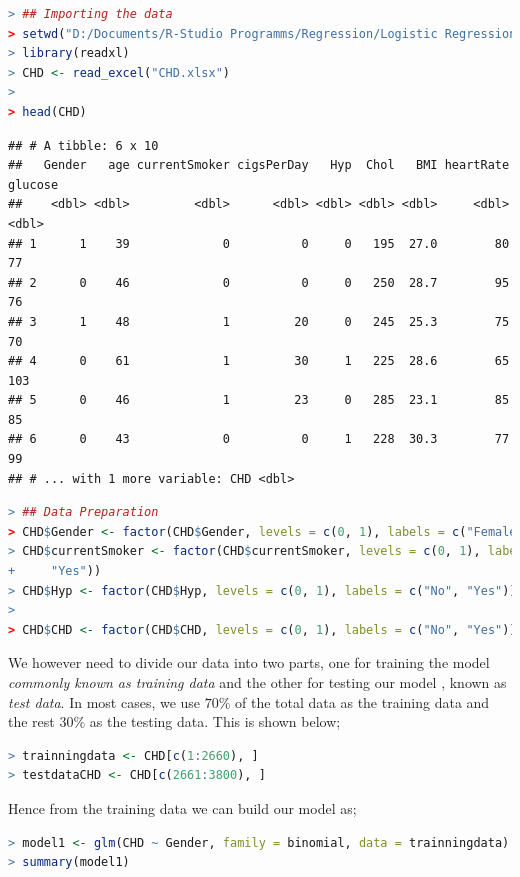 \documentclass[
]{article}
\begin{document}
\begin{lstlisting}[language=R]
> ## Importing the data
> setwd("D:/Documents/R-Studio Programms/Regression/Logistic Regression")
> library(readxl)
> CHD <- read_excel("CHD.xlsx")
> 
> head(CHD)
\end{lstlisting}

\begin{lstlisting}
## # A tibble: 6 x 10
##   Gender   age currentSmoker cigsPerDay   Hyp  Chol   BMI heartRate glucose
##    <dbl> <dbl>         <dbl>      <dbl> <dbl> <dbl> <dbl>     <dbl>   <dbl>
## 1      1    39             0          0     0   195  27.0        80      77
## 2      0    46             0          0     0   250  28.7        95      76
## 3      1    48             1         20     0   245  25.3        75      70
## 4      0    61             1         30     1   225  28.6        65     103
## 5      0    46             1         23     0   285  23.1        85      85
## 6      0    43             0          0     1   228  30.3        77      99
## # ... with 1 more variable: CHD <dbl>
\end{lstlisting}

\begin{lstlisting}[language=R]
> ## Data Preparation
> CHD$Gender <- factor(CHD$Gender, levels = c(0, 1), labels = c("Female", "Male"))
> CHD$currentSmoker <- factor(CHD$currentSmoker, levels = c(0, 1), labels = c("No",
+     "Yes"))
> CHD$Hyp <- factor(CHD$Hyp, levels = c(0, 1), labels = c("No", "Yes"))
> 
> CHD$CHD <- factor(CHD$CHD, levels = c(0, 1), labels = c("No", "Yes"))
\end{lstlisting}

We however need to divide our data into two parts, one for training the
model \emph{commonly known as training data} and the other for testing
our model , known as \emph{test data}. In most cases, we use \(70\%\) of
the total data as the training data and the rest \(30\%\) as the testing
data. This is shown below;

\begin{lstlisting}[language=R]
> trainningdata <- CHD[c(1:2660), ]
> testdataCHD <- CHD[c(2661:3800), ]
\end{lstlisting}

Hence from the training data we can build our model as;

\begin{lstlisting}[language=R]
> model1 <- glm(CHD ~ Gender, family = binomial, data = trainningdata)
> summary(model1)
\end{lstlisting}
\end{document}
